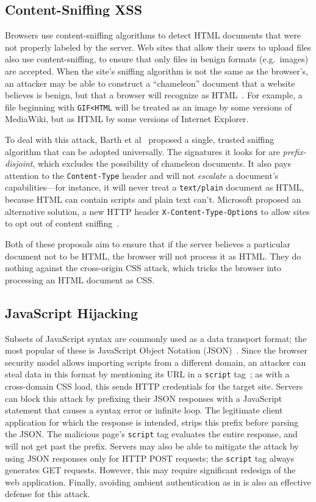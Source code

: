 \documentclass{acm_proc_article-sp}
\begin{document}
\subsection{Content-Sniffing XSS}
Browsers use content-sniffing algorithms to detect HTML documents that
were not properly labeled by the server. Web sites that allow their users to upload
files also use content-sniffing, to ensure that only files in benign
formats (e.g.\ images) are accepted.  When the site's sniffing
algorithm is not the same as the browser's, an attacker may be able to
construct a “chameleon” document that a website believes is benign,
but that a browser will recognize as
HTML~\cite{securecontentsniffing}.  For example, a file beginning with
\verb|GIF<HTML| will be treated as an image by some versions of
MediaWiki, but as HTML by some versions of Internet Explorer.

To deal with this attack, Barth et al~\cite{securecontentsniffing} proposed a
single, trusted sniffing algorithm that can be adopted universally.
The signatures it looks for are \emph{prefix-disjoint}, which excludes
the possibility of chameleon documents.  It also pays attention to the
\texttt{Content-Type} header and will not \emph{escalate} a document's
capabilities---for instance, it will never treat a \verb|text/plain|
document as HTML, because HTML can contain scripts and plain text
can't.  Microsoft proposed an alternative solution, a new HTTP header
\verb|X-Content-Type-Options| to allow sites to opt out of content
sniffing~\cite{nosniff}.

Both of these proposals aim to ensure that if the server believes a
particular document not to be HTML, the browser will not process it as
HTML.  They do nothing against the cross-origin CSS attack, which
tricks the browser into processing an HTML document as CSS.

\subsection{JavaScript Hijacking} \label{sec:json}
Subsets of JavaScript syntax are commonly used as a data transport
format; the most popular of these is JavaScript Object Notation
(JSON)~\cite{json}.  Since the browser security model allows importing
scripts from a different domain, an attacker can steal data in this
format by mentioning its URL in a \texttt{script}
tag~\cite{jshijacking}; as with a cross-domain CSS load, this sends
HTTP credentials for the target site.  Servers can block this attack
by prefixing their JSON responses with a JavaScript statement that
causes a syntax error or infinite loop.  The legitimate client
application for which the response is intended, strips this prefix
before parsing the JSON.  The malicious page's \texttt{script} tag
evaluates the entire response, and will not get past the prefix.
Servers may also be able to mitigate the attack by using JSON
responses only for HTTP POST requests; the \texttt{script} tag always
generates GET requests.  However, this may require significant
redesign of the web application.  Finally, avoiding ambient
authentication as in \cite{webkey} is also an effective defense for
this attack.
\end{document}
